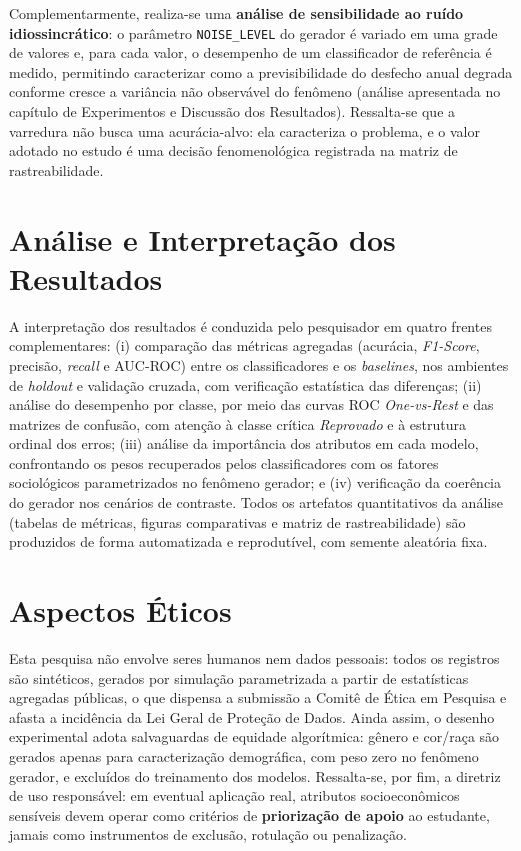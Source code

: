 Complementarmente, realiza-se uma \textbf{análise de sensibilidade ao ruído idiossincrático}: o parâmetro \texttt{NOISE\_LEVEL} do gerador é variado em uma grade de valores e, para cada valor, o desempenho de um classificador de referência é medido, permitindo caracterizar como a previsibilidade do desfecho anual degrada conforme cresce a variância não observável do fenômeno (análise apresentada no capítulo de Experimentos e Discussão dos Resultados). Ressalta-se que a varredura não busca uma acurácia-alvo: ela caracteriza o problema, e o valor adotado no estudo é uma decisão fenomenológica registrada na matriz de rastreabilidade.

\section{Análise e Interpretação dos Resultados}

A interpretação dos resultados é conduzida pelo pesquisador em quatro frentes complementares: (i) comparação das métricas agregadas (acurácia, \textit{F1-Score}, precisão, \textit{recall} e AUC-ROC) entre os classificadores e os \textit{baselines}, nos ambientes de \textit{holdout} e validação cruzada, com verificação estatística das diferenças; (ii) análise do desempenho por classe, por meio das curvas ROC \textit{One-vs-Rest} e das matrizes de confusão, com atenção à classe crítica \textit{Reprovado} e à estrutura ordinal dos erros; (iii) análise da importância dos atributos em cada modelo, confrontando os pesos recuperados pelos classificadores com os fatores sociológicos parametrizados no fenômeno gerador; e (iv) verificação da coerência do gerador nos cenários de contraste. Todos os artefatos quantitativos da análise (tabelas de métricas, figuras comparativas e matriz de rastreabilidade) são produzidos de forma automatizada e reprodutível, com semente aleatória fixa.

\section{Aspectos Éticos}

Esta pesquisa não envolve seres humanos nem dados pessoais: todos os registros são sintéticos, gerados por simulação parametrizada a partir de estatísticas agregadas públicas, o que dispensa a submissão a Comitê de Ética em Pesquisa e afasta a incidência da Lei Geral de Proteção de Dados. Ainda assim, o desenho experimental adota salvaguardas de equidade algorítmica: gênero e cor/raça são gerados apenas para caracterização demográfica, com peso zero no fenômeno gerador, e excluídos do treinamento dos modelos. Ressalta-se, por fim, a diretriz de uso responsável: em eventual aplicação real, atributos socioeconômicos sensíveis devem operar como critérios de \textbf{priorização de apoio} ao estudante, jamais como instrumentos de exclusão, rotulação ou penalização.
